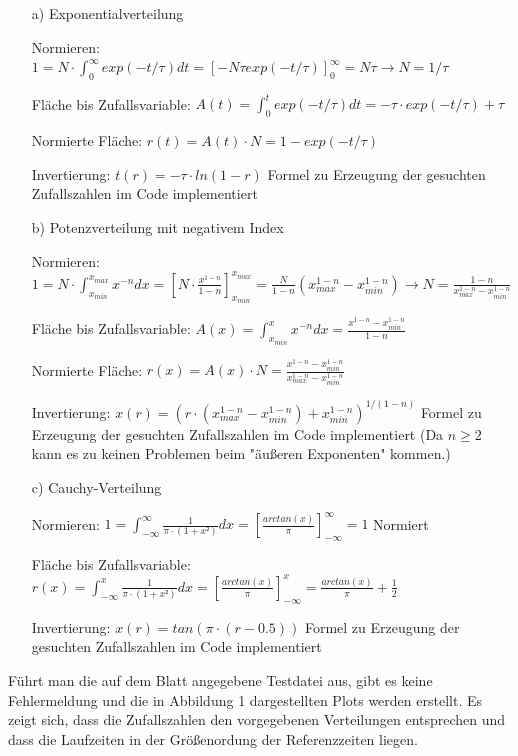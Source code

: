 \documentclass[11pt,a4paper]{article}
\begin{document}
	\begin{itemize}
		\item[a)] Exponentialverteilung

		Normieren: $1 = N\cdot \int_0^{\infty} exp(-t/\tau)dt = [-N \tau exp(-t/\tau)]_0^{\infty} = N \tau
					\to N = 1/\tau $

		Fläche bis Zufallsvariable: $A(t) = \int_0^{t} exp(-t/\tau)dt = - \tau \cdot exp(-t/\tau) + \tau $

		Normierte Fläche: $r(t) = A(t) \cdot N = 1 - exp(-t/\tau)$

		Invertierung: $t(r) = -\tau \cdot ln(1-r)$ \to Formel zu Erzeugung der gesuchten Zufallszahlen \to im Code implementiert


		\item[b)] Potenzverteilung mit negativem Index

		Normieren: $1 = N\cdot \int_{x_{min}}^{x_{max}} x^{-n}dx = [N \cdot \frac{x^{1-n}}{1-n}]_{x_{min}}^{x_{max}} = \frac{N}{1-n} (x_{max}^{1-n} - x_{min}^{1-n})
					\to N = \frac{1-n}{x_{max}^{1-n} - x_{min}^{1-n}} $

		Fläche bis Zufallsvariable: $A(x) = \int_{x_{min}}^{x} x^{-n}dx = \frac{x^{1-n} - x_{min}^{1-n}}{1-n} $

		Normierte Fläche: $r(x) = A(x) \cdot N = \frac{x^{1-n} - x_{min}^{1-n} }{x_{max}^{1-n} - x_{min}^{1-n}}$

		Invertierung: $x(r) = (r \cdot (x_{max}^{1-n} - x_{min}^{1-n}) + x_{min}^{1-n})^{1/(1-n)}$
		\to Formel zu Erzeugung der gesuchten Zufallszahlen \to im Code implementiert (Da $n \geq 2$ kann es zu keinen Problemen beim "äußeren Exponenten" kommen.)

		\item[c)] Cauchy-Verteilung

		Normieren: $1 = \int_{-\infty}^{\infty} \frac{1}{\pi \cdot (1+x²)} dx = [\frac{arctan(x)}{\pi}]_{- \infty}^{\infty} = 1$ \to Normiert

		Fläche bis Zufallsvariable: $r(x) = \int_{-\infty}^{x} \frac{1}{\pi \cdot (1+x²)} dx = [\frac{arctan(x)}{\pi}]_{- \infty}^{x} = \frac{arctan(x)}{\pi} + \frac{1}{2}$

		Invertierung: $x(r) = tan(\pi \cdot (r - 0.5))$
		\to Formel zu Erzeugung der gesuchten Zufallszahlen \to im Code implementiert
	\end{itemize}

	Führt man die auf dem Blatt angegebene Testdatei aus, gibt es keine Fehlermeldung und die in Abbildung 1 dargestellten
	Plots werden erstellt. Es zeigt sich, dass die Zufallszahlen den vorgegebenen Verteilungen entsprechen und dass die Laufzeiten
	in der Größenordung der Referenzzeiten liegen.
\end{document}
